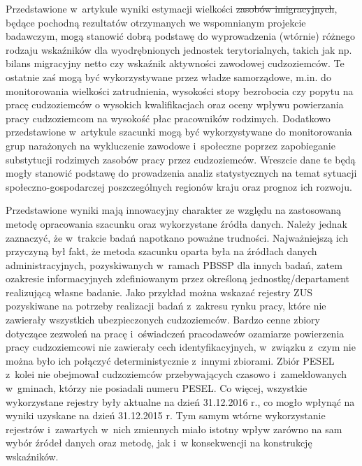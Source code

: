 \documentclass[12pt,a4paper]{article}
\providecommand{\DIFadd}[1]{{\protect\color{blue}\uwave{#1}}} %
\providecommand{\DIFdel}[1]{{\protect\color{red}\sout{#1}}}                      %
\providecommand{\DIFaddbegin}{} %
\providecommand{\DIFaddend}{} %
\providecommand{\DIFdelbegin}{} %
\providecommand{\DIFdelend}{} %
\begin{document}
Przedstawione w~artykule wyniki estymacji wielkości \DIFdelbegin \DIFdel{zasobów imigracyjnych}\DIFdelend \DIFaddbegin \DIFadd{populacji cudzoziemców}\DIFaddend , będące pochodną rezultatów otrzymanych we wspomnianym projekcie badawczym, mogą stanowić dobrą podstawę do wyprowadzenia (wtórnie) różnego rodzaju wskaźników dla wyodrębnionych jednostek terytorialnych, takich jak np. bilans migracyjny netto czy wskaźnik aktywności zawodowej cudzoziemców. Te ostatnie zaś mogą być wykorzystywane przez władze samorządowe, m.in. do monitorowania wielkości zatrudnienia, wysokości stopy bezrobocia czy popytu na pracę cudzoziemców o wysokich kwalifikacjach oraz oceny wpływu powierzania pracy cudzoziemcom na wysokość płac pracowników rodzimych. Dodatkowo przedstawione w~artykule szacunki mogą być wykorzystywane do monitorowania grup narażonych na wykluczenie zawodowe i~społeczne poprzez zapobieganie substytucji rodzimych zasobów pracy przez cudzoziemców. Wreszcie dane te będą mogły stanowić podstawę do prowadzenia analiz statystycznych na temat sytuacji społeczno-gospodarczej poszczególnych regionów kraju oraz prognoz ich rozwoju.

Przedstawione wyniki mają innowacyjny charakter ze względu na zastosowaną metodę opracowania szacunku oraz wykorzystane źródła danych. Należy jednak zaznaczyć, że w~trakcie badań napotkano poważne trudności. Najważniejszą ich przyczyną był fakt, że metoda szacunku oparta była na źródłach danych administracyjnych, pozyskiwanych w~ramach PBSSP dla innych badań, zatem o\DIFaddbegin \DIFadd{~}\DIFaddend zakresie informacyjnych zdefiniowanym przez określoną jednostkę/departament realizującą własne badanie. Jako przykład można wskazać rejestry ZUS pozyskiwane na potrzeby realizacji badań z~zakresu rynku pracy, które nie zawierały wszystkich ubezpieczonych cudzoziemców. Bardzo cenne zbiory dotyczące zezwoleń na pracę i~oświadczeń pracodawców o\DIFaddbegin \DIFadd{~}\DIFaddend zamiarze powierzenia pracy cudzoziemcowi nie zawierały cech identyfikacyjnych, w~związku z~czym nie można było ich połączyć deterministycznie z~innymi zbiorami. Zbiór PESEL z~kolei nie obejmował cudzoziemców przebywających czasowo i~zameldowanych w~gminach, którzy nie posiadali numeru PESEL. Co więcej, wszystkie wykorzystane rejestry były aktualne na dzień 31.12.2016 r., co mogło wpłynąć na wyniki uzyskane na dzień 31.12.2015 r. Tym samym wtórne wykorzystanie rejestrów i~zawartych w~nich zmiennych miało istotny wpływ zarówno na sam wybór źródeł danych oraz metodę, jak i~w konsekwencji na konstrukcję wskaźników.
\end{document}
